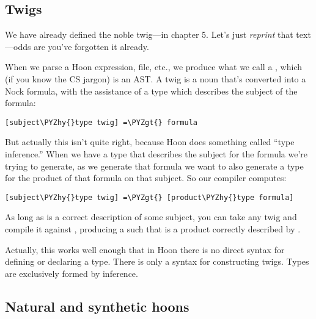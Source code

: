 \subsection{Twigs}

We have already defined the noble twig---in chapter 5.  Let's
just \emph{reprint} that text---odds are you've forgotten it already.

When we parse a Hoon expression, file, etc., we produce what we
call a , which (if you know the CS jargon) is an AST.  A
twig is a noun that's converted into a Nock formula, with
the assistance of a type which describes the subject of the
formula:

\begin{framed_shaded}
\begin{Verbatim}[fontsize=\relsize{-2.5},fontseries=b,commandchars=\\\{\}]
[subject\PYZhy{}type twig] =\PYZgt{} formula
\end{Verbatim}
\end{framed_shaded}
But actually this isn't quite right, because Hoon does something
called ``type inference.''  When we have a type that describes the
subject for the formula we're trying to generate, as we generate
that formula we want to also generate a type for the product of
that formula on that subject.  So our compiler computes:

\begin{framed_shaded}
\begin{Verbatim}[fontsize=\relsize{-2.5},fontseries=b,commandchars=\\\{\}]
[subject\PYZhy{}type twig] =\PYZgt{} [product\PYZhy{}type formula]
\end{Verbatim}
\end{framed_shaded}
As long as  is a correct description of some
subject, you can take any twig and compile it against
, producing a  such that  is a product correctly described by .

Actually, this works well enough that in Hoon there is no direct
syntax for defining or declaring a type.  There is only a syntax
for constructing twigs.  Types are exclusively formed by
inference.

\subsection{Natural and synthetic hoons}

